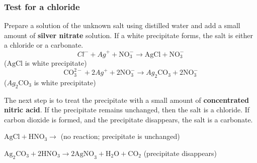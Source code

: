             \subsubsection*{Test for a chloride}
            \nopagebreak
        \label{m38719*id341138}Prepare a solution of the unknown salt using distilled water and add a small amount of \textbf{silver nitrate} solution. If a white precipitate forms, the salt is either a chloride or a carbonate.
        \label{m38719*id341148}\nopagebreak\noindent{}
    \begin{equation}
    {Cl}^{-}+{Ag}^{+}+\mathrm{NO}_{3}^{-}\to \mathrm{AgCl}+\mathrm{NO}_{3}^{-}\tag{17.24}
      \end{equation}
     ($\mathrm{AgCl}$ is white precipitate)
        \label{m38719*id341211}\nopagebreak\noindent{}
    \begin{equation}
    \mathrm{CO}_{3}^{2-}+2{Ag}^{+}+2\mathrm{NO}_{3}^{-}\to {Ag}_{2}{\mathrm{CO}}_{3}+2\mathrm{NO}_{3}^{-}\tag{17.25}
      \end{equation}
    (${Ag}_{2}{\mathrm{CO}}_{3}$ is white precipitate)\par 
        \label{m38719*id341323}The next step is to treat the precipitate with a small amount of \textbf{concentrated nitric acid}. If the precipitate remains unchanged, then the salt is a chloride. If carbon dioxide is formed, and the precipitate disappears, the salt is a carbonate.\par 
        \label{m38719*id341334}$\mathrm{AgCl}+{\mathrm{HNO}}_{3}\to $ (no reaction; precipitate is unchanged)\par 
        \label{m38719*id341361}${\mathrm{Ag}}_{2}{\mathrm{CO}}_{3}+2{\mathrm{HNO}}_{3}\to 2{\mathrm{AgNO}}_{3}+{\mathrm{H}}_{2}\mathrm{O}+{\mathrm{CO}}_{2}$ (precipitate disappears)\par 
      \label{m38719*uid71}

